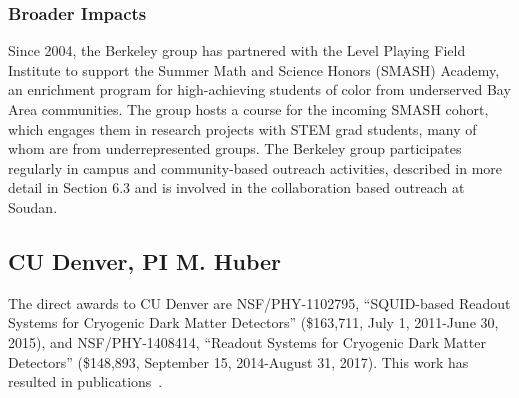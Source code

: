 \subsubsection{Broader Impacts}
Since 2004, the Berkeley group has partnered with the Level Playing Field Institute
to support the Summer Math and Science Honors (SMASH) Academy, an
enrichment program for high-achieving students of color from underserved Bay Area communities.
The group hosts a course for the incoming SMASH cohort, which engages them in research projects with
STEM grad students, many of whom are from underrepresented groups. 
The Berkeley group participates regularly
in campus and community-based outreach activities, described in more detail in Section 6.3 and is involved in the collaboration based outreach at Soudan.





\subsection{CU Denver, PI M. Huber}


The direct awards to CU Denver are NSF/PHY-1102795, ``SQUID-based Readout Systems for Cryogenic Dark Matter Detectors'' (\$163,711, July 1, 2011-June 30, 2015), and NSF/PHY-1408414, ``Readout Systems for Cryogenic Dark Matter Detectors'' (\$148,893, September 15, 2014-August 31, 2017). This work has resulted in publications~\cite{Agnese:13prl,Agnese:13apl,Agnese:13prl2,Agnese:2014aze,Agnese:2014vxh,Agnese:2014xye,Agnese:2015nto,Agnese:2015ywx}.

